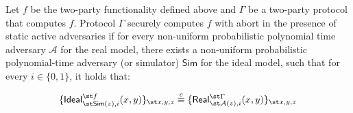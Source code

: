 \begin{definition}\label{def::MPC-active-adv}
Let $f$ be the two-party functionality defined above and $\Gamma$ be a two-party protocol that computes $f$.   Protocol $\Gamma$ securely computes $f$ with abort in the presence of static active adversaries if for every non-uniform probabilistic polynomial time adversary $\mathcal{A}$ for the real model, there exists a non-uniform probabilistic polynomial-time adversary (or simulator) $\mathsf{Sim}$ for the ideal model, such that for every $i\in \{0,1\}$, it holds that: 

\begin{equation*}
\{\mathsf {Ideal}^{\st f}_{\st \mathsf{Sim}(z), i}(x,y)\}_{\st x,y,z}\stackrel{c}{\equiv} \{\mathsf{Real}_{\st \mathcal{A}(z), i}^{\st \Gamma}(x,y) \}_{\st x,y,z}
\end{equation*}
%
\end{definition}
 
 
  
  